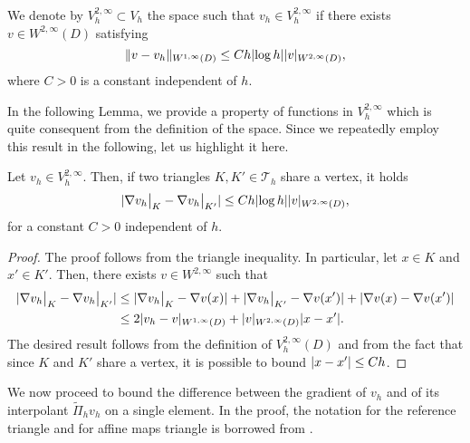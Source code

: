 \begin{definition}\label{def:Vh2Inf} We denote by $V_h^{2, \infty} \subset V_h$ the space such that $v_h \in V_h^{2, \infty}$ if there exists $v \in W^{2, \infty}(D)$ satisfying
	\begin{equation}
		\lVert v - v_h\rVert_{W^{1, \infty}(D)} \leq C h \lvert\log h\rvert \lvert v\rvert_{W^{2, \infty}(D)},
	\end{equation} 
	where $C > 0$ is a constant independent of $h$.
\end{definition}

In the following Lemma, we provide a property of functions in $V_h^{2, \infty}$ which is quite consequent from the definition of the space. Since we repeatedly employ this result in the following, let us highlight it here.
\begin{lemma}\label{lem:Vh2InfPropr} Let $v_h \in V_h^{2, \infty}$. Then, if two triangles $K, K' \in \mathcal T_h$ share a vertex, it holds
	\begin{equation}
		\lvert\nabla v_h \bigr\rvert_{K} - \nabla v_h \bigr\rvert_{K'}\rvert \leq Ch \lvert\log h\rvert \lvert v\rvert_{W^{2, \infty}(D)},
	\end{equation} 
	for a constant $C > 0$ independent of $h$.
\end{lemma}
\begin{proof} The proof follows from the triangle inequality. In particular, let $x \in K$ and $x' \in K'$. Then, there exists $v \in W^{2, \infty}$ such that
	\begin{equation}
	\begin{aligned}
		\lvert\nabla v_h \bigr\rvert_{K} - \nabla v_h \bigr\rvert_{K'}\rvert &\leq \lvert\nabla v_h \bigr\rvert_{K} - \nabla v(x)\rvert + \lvert\nabla v_h \bigr\rvert_{K'} - \nabla v (x')\rvert + \lvert\nabla v (x) - \nabla v (x')\rvert\\
		&\leq 2 \lvert v_h - v\rvert_{W^{1, \infty}(D)} + \lvert v\rvert_{W^{2, \infty}(D)}\lvert x - x'\rvert.
	\end{aligned}
	\end{equation}
	The desired result follows from the definition of $V_h^{2, \infty}(D)$ and from the fact that since $K$ and $K'$ share a vertex, it is possible to bound $\lvert x - x'\rvert \leq Ch$.
\end{proof}

We now proceed to bound the difference between the gradient of $v_h$ and of its interpolant $\widetilde \Pi_h v_h$ on a single element. In the proof, the notation for the reference triangle and for affine maps triangle is borrowed from \cite[Chapter 4]{Qua09}.

